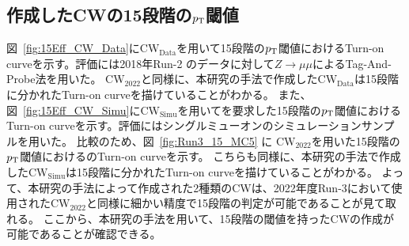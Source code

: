 \subsection{作成したCWの15段階の$p_{\rm{T}}$閾値}
図~\ref{fig:15Eff_CW_Data}に$\mathrm{CW_{Data}}$を用いて15段階の$p_{\rm{T}}$閾値におけるTurn-on curveを示す。評価には2018年Run-2 のデータに対して$Z\rightarrow \mu\mu$によるTag-And-Probe法を用いた。
$\mathrm{CW_{2022}}$と同様に、本研究の手法で作成した$\mathrm{CW_{Data}}$は15段階に分かれたTurn-on curveを描けていることがわかる。
また、図~\ref{fig:15Eff_CW_Simu}に$\mathrm{CW_{Simu}}$を用いてを要求した15段階の$p_{\rm{T}}$閾値におけるTurn-on curveを示す。評価にはシングルミューオンのシミュレーションサンプルを用いた。
比較のため、図~\ref{fig:Run3_15_MC5} に $\mathrm{CW_{2022}}$を用いた15段階の$p_{\rm{T}}$閾値におけるのTurn-on curveを示す。
こちらも同様に、本研究の手法で作成した$\mathrm{CW_{Simu}}$は15段階に分かれたTurn-on curveを描けていることがわかる。
よって、本研究の手法によって作成された2種類のCWは、2022年度Run-3において使用された$\mathrm{CW_{2022}}$と同様に細かい精度で15段階の判定が可能であることが見て取れる。
ここから、本研究の手法を用いて、15段階の閾値を持ったCWの作成が可能であることが確認できる。
